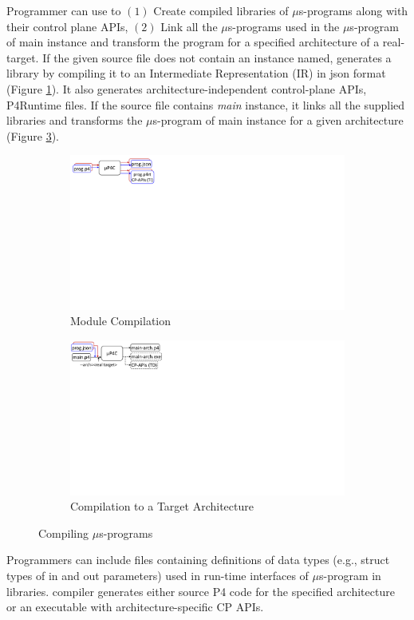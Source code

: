 \documentclass[letterpaper,twocolumn,10pt]{article}
\begin{document}
Programmer can use \ucomp to $(1)$ Create compiled libraries of $\mu$s-programs along with their control plane APIs, $(2)$ Link all the $\mu$s-programs used in the $\mu$s-program of main instance and transform the program for a specified architecture of a real-target.
If the given source file does not contain an instance named, \ucomp generates a library by compiling it to an Intermediate Representation (IR) in json format (Figure \ref{subfig:module-compilation}).
It also generates architecture-independent control-plane APIs, P4Runtime \cite{p4runtime} files.
If the source file contains \emph{main} instance, it links all the supplied libraries and transforms the $\mu$s-program of main instance for a given architecture (Figure \ref{subfig:compilation-to-target-architecture}).
\begin{figure}[h]
    \begin{subfigure}{\linewidth}
        \centering
        \includegraphics[trim=10 440 666 0, clip,scale=0.5]{mp4c-frontend.pdf}
         \caption{Module Compilation}
         \label{subfig:module-compilation}
    \end{subfigure}
    \begin{subfigure}{\linewidth}
        \centering
        \includegraphics[trim=3 440 640 0, clip,scale=0.5]{mp4c-compiler}
        \caption{Compilation to a Target Architecture}
        \label{subfig:compilation-to-target-architecture}
    \end{subfigure}
    \caption{Compiling $\mu$s-programs}
\end{figure}
Programmers can include files containing definitions of data types (e.g., struct types of in and out parameters) used in run-time interfaces of $\mu$s-program in libraries.
\ucomp compiler generates either source P4 code for the specified architecture or an executable with architecture-specific CP APIs.
\end{document}
